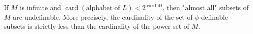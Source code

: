 If $M$ is infinite and $\operatorname{card}(\text{alphabet of } L) < 2^{\operatorname{card} M}$, then "almost all" subsets of $M$ are undefinable. More precisely, the cardinality of the set of $\phi$-definable subsets is strictly less than the cardinality of the power set of $M$.
